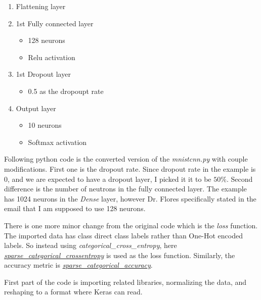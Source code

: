 \documentclass[11pt]{article}
\begin{document}
\begin{enumerate}
    \item Flattening layer
    \item 1st Fully connected layer
    \begin{itemize}
        \item 128 neurons
        \item Relu activation
    \end{itemize}
    \item 1st Dropout layer
    \begin{itemize}
        \item 0.5 as the dropoupt rate
    \end{itemize}
    \item Output layer
    \begin{itemize}
        \item 10 neurons
        \item Softmax activation
    \end{itemize}
\end{enumerate}

Following python code is the converted version of the \emph{mnistcnn.py} with couple modifications. First one is the dropout rate. Since dropout rate in the example is 0, and we are expected to have a dropout layer, I picked it it to be $50\%$. Second difference is the number of neutrons in the fully connected layer. The example has 1024 neurons in the \emph{Dense} layer, however Dr. Flores specifically stated in the email that I am supposed to use 128 neurons. \medskip

There is one more minor change from the original code which is the \emph{loss} function. The imported data has class direct class labels rather than One-Hot encoded labels. So instead using \emph{categorical\_cross\_entropy}, here \emph{\underline{sparse\_categorical\_crossentropy}} is used as the loss function. Similarly, the accuracy metric is \emph{\underline{sparse\_categorical\_accuracy}}. \medskip

First part of the code is importing related libraries, normalizing the data, and reshaping to a format where Keras can read.\medskip
\end{document}
